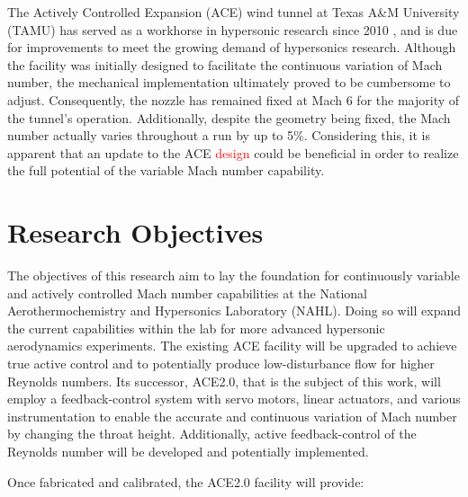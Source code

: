The Actively Controlled Expansion (ACE) wind tunnel at Texas A\&M University (TAMU) has served as a workhorse in hypersonic research since 2010 \cite{ace09,ace10-calibrate,tichenor-dis,aceturb,mai-dis,neel-dis,leidy-dis}, and is due for improvements to meet the growing demand of hypersonics research. Although the facility was initially designed to facilitate the continuous variation of Mach number, the mechanical implementation ultimately proved to be cumbersome to adjust. Consequently, the nozzle has remained fixed at Mach 6 for the majority of the tunnel's operation. Additionally, despite the geometry being fixed, the Mach number actually varies throughout a run by up to 5\%. Considering this, it is apparent that an update to the ACE \textcolor{red}{design} could be beneficial in order to realize the full potential of the variable Mach number capability.

\section{Research Objectives}

The objectives of this research aim to lay the foundation for continuously variable and actively controlled Mach number capabilities at the National Aerothermochemistry and Hypersonics Laboratory (NAHL). Doing so will expand the current capabilities within the lab for more advanced hypersonic aerodynamics experiments. The existing ACE facility will be upgraded to achieve true active control and to potentially produce low-disturbance flow for higher Reynolds numbers. Its successor, ACE2.0, that is the subject of this work, will employ a feedback-control system with servo motors, linear actuators, and various instrumentation to enable the accurate and continuous variation of Mach number by changing the throat height. Additionally, active feedback-control of the Reynolds number will be developed and potentially implemented. 

Once fabricated and calibrated, the ACE2.0 facility will provide:

